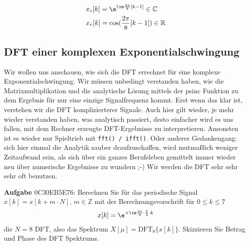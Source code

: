 \begin{Loesung}
\begin{align}
&x_c[k] = \e^{\im \frac{2\pi}{8} [k -1] } \in\mathbb{C}\\
&x_r[k] = \cos(\frac{2\pi}{8} [k-1]) \in\mathbb{R}
\end{align}
\end{Loesung}




















\newpage
\subsection{DFT einer komplexen Exponentialschwingung}
\label{sec:0C30EB5E76}
\begin{Ziel}
Wir wollen uns anschauen, wie sich die DFT errechnet für eine komplexe
Exponentialschwingung. Wir müssen unbedingt verstanden haben, wie die
Matrixmultiplikation und die analytische Lösung mittels der psinc Funktion
zu dem Ergebnis für nur eine einzige Signalfrequenz kommt. Erst wenn das
klar ist, verstehen wir die DFT komplizierterer Signale. Auch hier gilt
wieder, je mehr wieder verstanden haben, was analytisch passiert, desto einfacher
wird es uns fallen, mit dem Rechner erzeugte DFT-Ergebnisse zu interpretieren.
Ansonsten ist es wieder nur Spieltrieb mit \texttt{fft() / ifft()}.
%
Oder anderer Gedankengang: sich hier einmal die Analytik sauber draufzuschaffen,
wird mutmaßlich weniger Zeitaufwand sein, als sich über ein ganzes Berufsleben
gemittelt immer wieder neu über numerische Ergebnisse zu wundern ;-) Wir werden
die DFT sehr sehr sehr oft benutzen.
\end{Ziel}
\textbf{Aufgabe} {\tiny 0C30EB5E76}: Berechnen Sie für das periodische
Signal $x[k]=x[k+m \cdot N]$, $m\in\mathbb{Z}$
mit der Berechnungsvorschrift für $0\leq k \leq 7$
\begin{align}
x[k] = \e^{+\im \frac{2\pi}{8} \cdot \frac{5}{2} \cdot k}
\end{align}
die $N=8$ DFT, also das Spektrum $X[\mu] = \mathrm{DFT}_8\{x[k]\}$.
%
Skizzieren Sie Betrag und Phase des DFT Spektrums.


